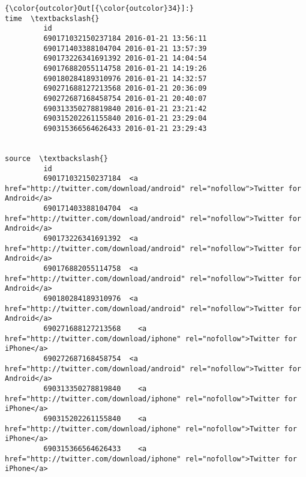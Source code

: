 \documentclass[11pt]{article}
\begin{document}
\begin{Verbatim}[commandchars=\\\{\}]
{\color{outcolor}Out[{\color{outcolor}34}]:}                                   time  \textbackslash{}
         id                                       
         690171032150237184 2016-01-21 13:56:11   
         690171403388104704 2016-01-21 13:57:39   
         690173226341691392 2016-01-21 14:04:54   
         690176882055114758 2016-01-21 14:19:26   
         690180284189310976 2016-01-21 14:32:57   
         690271688127213568 2016-01-21 20:36:09   
         690272687168458754 2016-01-21 20:40:07   
         690313350278819840 2016-01-21 23:21:42   
         690315202261155840 2016-01-21 23:29:04   
         690315366564626433 2016-01-21 23:29:43   
         
                                                                                                           source  \textbackslash{}
         id                                                                                                         
         690171032150237184  <a href="http://twitter.com/download/android" rel="nofollow">Twitter for Android</a>   
         690171403388104704  <a href="http://twitter.com/download/android" rel="nofollow">Twitter for Android</a>   
         690173226341691392  <a href="http://twitter.com/download/android" rel="nofollow">Twitter for Android</a>   
         690176882055114758  <a href="http://twitter.com/download/android" rel="nofollow">Twitter for Android</a>   
         690180284189310976  <a href="http://twitter.com/download/android" rel="nofollow">Twitter for Android</a>   
         690271688127213568    <a href="http://twitter.com/download/iphone" rel="nofollow">Twitter for iPhone</a>   
         690272687168458754  <a href="http://twitter.com/download/android" rel="nofollow">Twitter for Android</a>   
         690313350278819840    <a href="http://twitter.com/download/iphone" rel="nofollow">Twitter for iPhone</a>   
         690315202261155840    <a href="http://twitter.com/download/iphone" rel="nofollow">Twitter for iPhone</a>   
         690315366564626433    <a href="http://twitter.com/download/iphone" rel="nofollow">Twitter for iPhone</a>   
         

\end{Verbatim}
\end{document}
